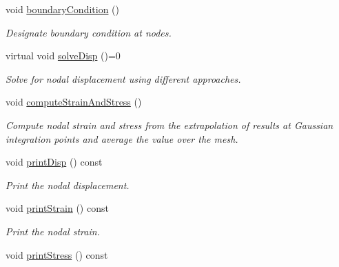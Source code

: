 \begin{DoxyCompactItemize}
void \mbox{\hyperlink{class_analysis_aec157316b08568c84d8d8344a724ff89}{boundary\+Condition}} ()
\begin{DoxyCompactList}\small\item\em Designate boundary condition at nodes. \end{DoxyCompactList}\item 
\mbox{\label{class_analysis_a93e6427625d7441986e8045da772892f}} 
virtual void \mbox{\hyperlink{class_analysis_a93e6427625d7441986e8045da772892f}{solve\+Disp}} ()=0
\begin{DoxyCompactList}\small\item\em Solve for nodal displacement using different approaches. \end{DoxyCompactList}\item 
\mbox{\label{class_analysis_a00c4b54646392d48ea2862ab3987a96d}} 
void \mbox{\hyperlink{class_analysis_a00c4b54646392d48ea2862ab3987a96d}{compute\+Strain\+And\+Stress}} ()
\begin{DoxyCompactList}\small\item\em Compute nodal strain and stress from the extrapolation of results at Gaussian integration points and average the value over the mesh. \end{DoxyCompactList}\item 
\mbox{\label{class_analysis_a6def63bf2890a4d9fa76c1af350703b8}} 
void \mbox{\hyperlink{class_analysis_a6def63bf2890a4d9fa76c1af350703b8}{print\+Disp}} () const
\begin{DoxyCompactList}\small\item\em Print the nodal displacement. \end{DoxyCompactList}\item 
\mbox{\label{class_analysis_ab3087cac038045cc9cc4b8b8e200d16b}} 
void \mbox{\hyperlink{class_analysis_ab3087cac038045cc9cc4b8b8e200d16b}{print\+Strain}} () const
\begin{DoxyCompactList}\small\item\em Print the nodal strain. \end{DoxyCompactList}\item 
\mbox{\label{class_analysis_a81a4488de8e18d1c067c94a9edd2ac61}} 
void \mbox{\hyperlink{class_analysis_a81a4488de8e18d1c067c94a9edd2ac61}{print\+Stress}} () const

\end{DoxyCompactItemize}
